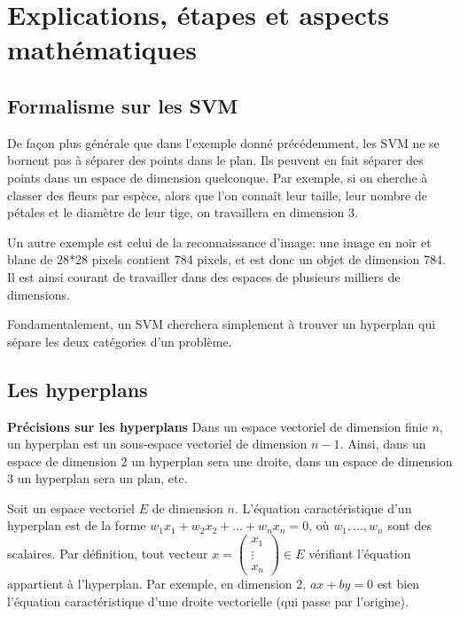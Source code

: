 \documentclass{article}
\begin{document}
\section{Explications, étapes  et aspects mathématiques}

\vspace{5mm} %
\subsection{Formalisme sur les SVM}
\vspace{5mm} %
De façon plus générale que dans l'exemple donné précédemment, les SVM ne se bornent pas à séparer des points dans le plan. 
Ils peuvent en fait séparer des points dans un espace de dimension quelconque.
Par exemple, si on cherche à classer des fleurs par espèce, alors que l’on connaît leur taille, leur nombre de pétales et le diamètre de leur tige, on travaillera en dimension 3.

Un autre exemple est celui de la reconnaissance d’image: une image en noir et blanc de 28*28 pixels contient 784 pixels, et est donc un objet de dimension 784. Il est ainsi courant de travailler dans des espaces de plusieurs milliers de dimensions.

Fondamentalement, un SVM cherchera simplement à trouver un hyperplan qui sépare les deux catégories d'un problème.

\vspace{5mm} %
\subsection{Les hyperplans}
\vspace{5mm} %
\textbf{Précisions sur les hyperplans}
\vspace{5mm} %
Dans un espace vectoriel de dimension finie $n$, un hyperplan est un sous-espace vectoriel de dimension $n-1$. Ainsi, dans un espace de dimension $2$ un hyperplan sera une droite, dans un espace de dimension $3$ un hyperplan sera un plan, etc.

Soit un espace vectoriel $E$ de dimension $n$. L’équation caractéristique d’un hyperplan est de la forme $w_1 x_1+w_2 x_2+\dots+w_n x_n=0$, où $w_1, \dotsc, w_n$ sont des scalaires. Par définition, tout vecteur $x = \left( \begin{array}{c} x_1 \\ \vdots \\ x_n \end{array} \right) \in E$ vérifiant l’équation appartient à l’hyperplan. Par exemple, en dimension $2$, $ax+by=0$ est bien l’équation caractéristique d’une droite vectorielle (qui passe par l’origine).
\end{document}
